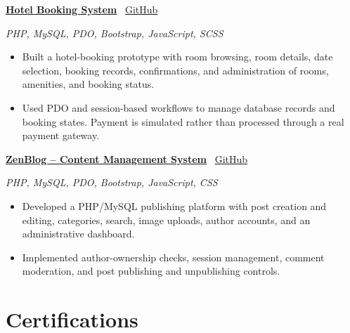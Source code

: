 \documentclass[a4paper,10pt]{article}
\newcommand{\projecttitle}[2]{%
    \Needspace{9\baselineskip}%
    \vspace{3pt}%
    \textbf{\href{#2}{#1}}%
    \hfill
    \faGithub\ \href{#2}{GitHub}%
    \par
}
\newcommand{\techstack}[1]{%
    {\fontsize{8.5}{10}\selectfont\itshape #1\par}
}
\begin{document}
\projecttitle
{Hotel Booking System}
{https://github.com/fahim-fardin-1045/hotel_booking}

\techstack{PHP, MySQL, PDO, Bootstrap, JavaScript, SCSS}

\begin{itemize}
    \item Built a hotel-booking prototype with room browsing,
    room details, date selection, booking records, confirmations,
    and administration of rooms, amenities, and booking status.

    \item Used PDO and session-based workflows to manage database
    records and booking states. Payment is simulated rather than
    processed through a real payment gateway.
\end{itemize}

\projecttitle
{ZenBlog -- Content Management System}
{https://github.com/fahim-fardin-1045/php_zen-blog}

\techstack{PHP, MySQL, PDO, Bootstrap, JavaScript, CSS}

\begin{itemize}
    \item Developed a PHP/MySQL publishing platform with post
    creation and editing, categories, search, image uploads,
    author accounts, and an administrative dashboard.

    \item Implemented author-ownership checks, session management,
    comment moderation, and post publishing and unpublishing controls.
\end{itemize}


\section*{Certifications}
\end{document}
